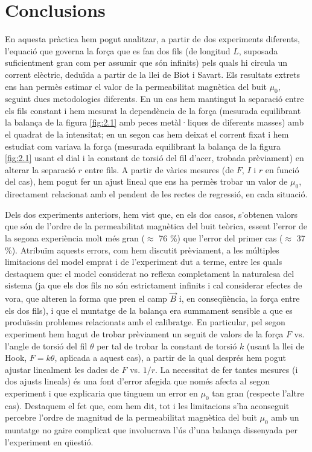 \documentclass[a4paper,10.5pt]{report}
\begin{document}
\section{Conclusions}
En aquesta pràctica hem pogut analitzar, a partir de dos experiments diferents, l'equació que governa la força que es fan dos fils (de longitud $L$, suposada suficientment gran com per assumir que són infinits) pels quals hi circula un corrent elèctric, deduïda a partir de la llei de Biot i Savart. Els resultats extrets ens han permès estimar el valor de la permeabilitat magnètica del buit $\mu_0$, seguint dues metodologies diferents. En un cas hem mantingut la separació entre els fils constant i hem mesurat la dependència de la força (mesurada equilibrant la balança de la figura \ref{fig:2.1} amb peces metàl·liques de diferents masses) amb el quadrat de la intensitat; en un segon cas hem deixat el corrent fixat i hem estudiat com variava la força (mesurada equilibrant la balança de la figura \ref{fig:2.1} usant el dial i la constant de torsió del fil d'acer, trobada prèviament) en alterar la separació $r$ entre fils. A partir de vàries mesures (de $F$, $I$ i $r$ en funció del cas), hem pogut fer un ajust lineal que ens ha permès trobar un valor de $\mu_0$, directament relacionat amb el pendent de les rectes de regressió, en cada situació.

Dels dos experiments anteriors, hem vist que, en els dos casos, s'obtenen valors que són de l'ordre de la permeabilitat magnètica del buit teòrica, essent l'error de la segona experiència molt més gran ($\approx$ 76 \%) que l'error del primer cas ($\approx$ 37 \%). Atribuïm aquests errors, com hem discutit prèviament, a les múltiples limitacions del model emprat i de l'experiment dut a terme, entre les quals destaquem que: el model considerat no reflexa completament la naturalesa del sistema (ja que els dos fils no són estrictament infinits i cal considerar efectes de vora, que alteren la forma que pren el camp $\vec{B}$ i, en conseqüència, la força entre els dos fils), i que el muntatge de la balança era summament sensible a que es produïssin problemes relacionats amb el calibratge. En particular, pel segon experiment hem hagut de trobar prèviament un seguit de valors de la força $F$ vs. l'angle de torsió del fil $\theta$ per tal de trobar la constant de torsió $k$ (usant la llei de Hook, $F=k\theta$, aplicada a aquest cas), a partir de la qual després hem pogut ajustar linealment les dades de $F$ vs. $1/r$. La necessitat de fer tantes mesures (i dos ajusts lineals) és una font d'error afegida que només afecta al segon experiment i que explicaria que tinguem un error en $\mu_0$ tan gran (respecte l'altre cas). Destaquem el fet que, com hem dit, tot i les limitacions s'ha aconseguit percebre l'ordre de magnitud de la permeabilitat magnètica del buit $\mu_0$ amb un muntatge no gaire complicat que involucrava l'ús d'una balança dissenyada per l'experiment en qüestió.
\end{document}
